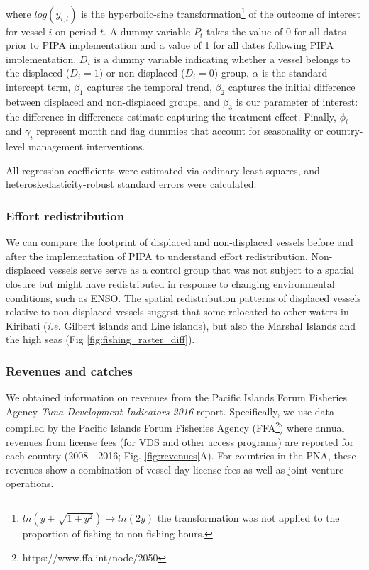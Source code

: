 \documentclass[12pt]{article}
\begin{document}
\noindent where $log(y_{i,t})$ is the hyperbolic-sine transformation\footnote{$ln\left(y + \sqrt{1 + y^2}\right)\rightarrow ln(2y)$ the transformation was not applied to the proportion of fishing to non-fishing hours.} of the outcome of interest for vessel $i$ on period $t$. A dummy variable $P_t$ takes the value of 0 for all dates prior to PIPA implementation and a value of 1 for all dates following PIPA implementation. $D_i$ is a dummy variable indicating whether a vessel belongs to the displaced ($D_i = 1$) or non-displaced ($D_i = 0$) group. $\alpha$ is the standard intercept term, $\beta_1$ captures the temporal trend, $\beta_2$ captures the initial difference between displaced and non-displaced groups, and $\beta_3$ is our parameter of interest: the difference-in-differences estimate capturing the treatment effect. Finally, $\phi_t$ and $\gamma_i$ represent month and flag dummies that account for seasonality or country-level management interventions.

All regression coefficients were estimated via ordinary least squares, and heteroskedasticity-robust standard errors were calculated.

\subsubsection{Effort redistribution}

We can compare the footprint of displaced and non-displaced vessels before and after the implementation of PIPA to understand effort redistribution. Non-displaced vessels serve serve as a control group that was not subject to a spatial closure but might have redistributed in response to changing environmental conditions, such as ENSO. The spatial redistribution patterns of displaced vessels relative to non-displaced vessels suggest that some relocated to other waters in Kiribati (\emph{i.e.} Gilbert islands and Line islands), but also the Marshal Islands and the high seas (Fig \ref{fig:fishing_raster_diff}).

\subsubsection{Revenues and catches}

We obtained information on revenues from the Pacific Islands Forum Fisheries Agency \emph{Tuna Development Indicators 2016} report.  Specifically, we use data compiled by the Pacific Islands Forum Fisheries Agency (FFA\footnote{https://www.ffa.int/node/2050}) where annual revenues from license fees (for VDS and other access programs) are reported for each country (2008 - 2016; Fig. \ref{fig:revenues}A). For countries in the PNA, these revenues show a combination of vessel-day license fees as well as joint-venture operations.
\end{document}
